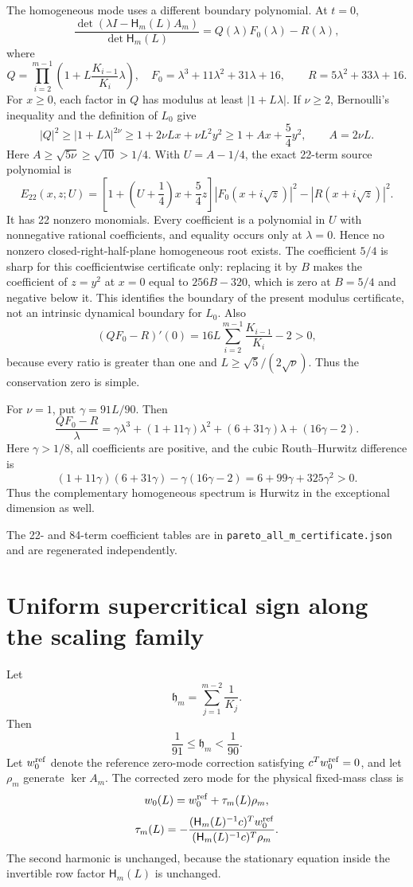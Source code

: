 The homogeneous mode uses a different boundary polynomial.  At $t=0$,
\[
 \frac{\det(\lambda I-\mathsf H_m(L)A_m)}{
 \det\mathsf H_m(L)}=Q(\lambda)F_0(\lambda)-R(\lambda),
\]
where
\[
 Q=\prod_{i=2}^{m-1}
 \left(1+L\frac{K_{i-1}}{K_i}\lambda\right),
 \quad F_0=\lambda^3+11\lambda^2+31\lambda+16,
 \qquad R=5\lambda^2+33\lambda+16.
\]
For $x\ge0$, each factor in $Q$ has modulus at least $|1+L\lambda|$.
If $\nu\ge2$, Bernoulli's inequality and the definition of $L_0$ give
\[
 |Q|^2\ge |1+L\lambda|^{2\nu}
 \ge1+2\nu Lx+\nu L^2y^2
 \ge1+Ax+\frac54y^2,
 \qquad A=2\nu L.
\]
Here $A\ge\sqrt{5\nu}\ge\sqrt{10}>1/4$.
With $U=A-1/4$, the exact 22-term source polynomial is
\[
 E_{22}(x,z;U)=
 \left[1+\left(U+\frac14\right)x+\frac54z\right]
 |F_0(x+i\sqrt z)|^2-|R(x+i\sqrt z)|^2.
\]
It has 22 nonzero monomials.  Every coefficient is a
polynomial in $U$ with nonnegative rational coefficients, and equality occurs
only at $\lambda=0$.  Hence no nonzero closed-right-half-plane homogeneous
root exists.  The coefficient $5/4$ is sharp for this coefficientwise
certificate only: replacing it by $B$ makes the coefficient of $z=y^2$ at
$x=0$ equal to $256B-320$, which is zero at $B=5/4$ and negative below it.
This identifies the boundary of the present modulus certificate, not an
intrinsic dynamical boundary for $L_0$.  Also
\[
 (QF_0-R)'(0)
 =16L\sum_{i=2}^{m-1}\frac{K_{i-1}}{K_i}-2>0,
\]
because every ratio is greater than one and
$L\ge\sqrt5/(2\sqrt\nu)$.  Thus the conservation zero is simple.

For $\nu=1$, put $\gamma=91L/90$.  Then
\[
 \frac{QF_0-R}{\lambda}
 =\gamma\lambda^3+(1+11\gamma)\lambda^2
 +(6+31\gamma)\lambda+(16\gamma-2).
\]
Here $\gamma>1/8$, all coefficients are positive, and the cubic Routh--Hurwitz
difference is
\[
 (1+11\gamma)(6+31\gamma)-\gamma(16\gamma-2)
 =6+99\gamma+325\gamma^2>0.
\]
Thus the complementary homogeneous spectrum is Hurwitz in the exceptional
dimension as well.

The 22- and 84-term coefficient tables are in
\texttt{pareto\_all\_m\_certificate.json} and are regenerated independently.


\section*{Uniform supercritical sign along the scaling family}
Let
\[
 \mathfrak h_m=\sum_{j=1}^{m-2}\frac1{K_j}.
\]
Then
\[
 \frac1{91}\le\mathfrak h_m<\frac1{90}.
\]
Let $w_0^{\rm ref}$ denote the reference zero-mode correction satisfying
$c^Tw_0^{\rm ref}=0$, and let $\rho_m$ generate $\ker A_m$.  The corrected
zero mode for the physical fixed-mass class is
\[
 w_0(L)=w_0^{\rm ref}+\tau_m(L)\rho_m,
\]
\[
 \tau_m(L)=-\frac{(\mathsf H_m(L)^{-1}c)^Tw_0^{\rm ref}}
 {(\mathsf H_m(L)^{-1}c)^T\rho_m}.
\]
The second harmonic is unchanged, because the stationary equation inside the
invertible row factor $\mathsf H_m(L)$ is unchanged.


